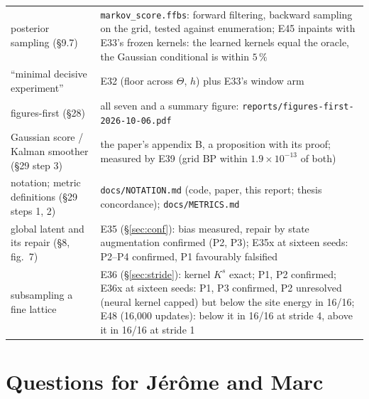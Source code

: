 \documentclass[10pt,a4paper]{article}
\newcommand{\Th}{\Theta}
\newcommand{\code}[1]{\texttt{\small #1}}
\theoremstyle{plain}
\theoremstyle{remark}
\begin{document}
\begin{table}[h]
\begin{tabular}{@{}p{4.3cm} p{12.2cm}@{}}
posterior sampling (\S9.7) & \code{markov\_score.ffbs}: forward filtering, backward sampling on the grid, tested against enumeration; E45 inpaints with E33's frozen kernels: the learned kernels equal the oracle, the Gaussian conditional is within $5\,\%$ \\
``minimal decisive experiment'' & E32 (floor across $\Th$, $h$) plus E33's window arm \\
figures-first (\S28) & all seven and a summary figure: \code{reports/figures-first-2026-10-06.pdf} \\
Gaussian score / Kalman smoother (\S29 step 3) & the paper's appendix B, a proposition with its proof; measured by E39 (grid BP within $1.9\times10^{-13}$ of both) \\
notation; metric definitions (\S29 steps 1, 2) & \code{docs/NOTATION.md} (code, paper, this report; thesis concordance); \code{docs/METRICS.md} \\
global latent and its repair (\S8, fig.~7) & E35 (\S\ref{sec:conf}): bias measured, repair by state augmentation confirmed (P2, P3); E35x at sixteen seeds: P2--P4 confirmed, P1 favourably falsified \\
subsampling a fine lattice & E36 (\S\ref{sec:stride}): kernel $K^s$ exact; P1, P2 confirmed; E36x at sixteen seeds: P1, P3 confirmed, P2 unresolved (neural kernel capped) but below the site energy in 16/16; E48 (16,000 updates): below it in 16/16 at stride 4, above it in 16/16 at stride 1 \\
\bottomrule
\end{tabular}
\end{table}

\section{Questions for Jérôme and Marc}
\end{document}
